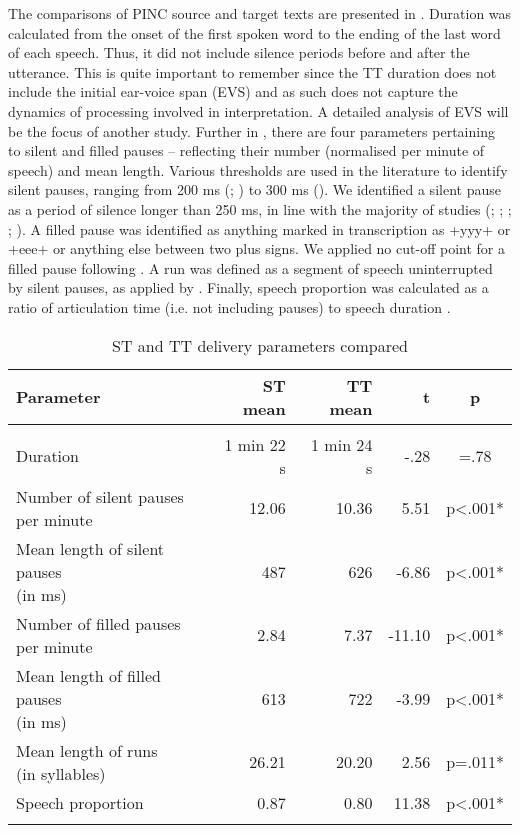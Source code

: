 \documentclass[output=paper]{langscibook}
\begin{document}
The comparisons of PINC source and target texts are presented in . Duration was calculated from the onset of the first spoken word to the ending of the last word of each speech. Thus, it did not include silence periods before and after the utterance. This is quite important to remember since the TT duration does not include the initial ear-voice span (EVS) and as such does not capture the dynamics of processing involved in interpretation. A detailed analysis of EVS will be the focus of another study. Further in , there are four parameters pertaining to silent and filled pauses – reflecting their number (normalised per minute of speech) and mean length. Various thresholds are used in the literature to identify silent pauses, ranging from 200 ms (\citealt{ChmielEtAl2017ear}; \citealt{CollardDefrancq2019}) to 300 ms (\citealt{WangLi2014}). We identified a silent pause as a period of silence longer than 250 ms, in line with the majority of studies (\citealt{Cecot2001}; \citealt{HanEtAl2020}; \citealt{Mead2005}; \citealt{PradasMacias2006}; \citealt{Tissi2000}). A filled pause was identified as anything marked in transcription as +yyy+ or +eee+ or anything else between two plus signs. We applied no cut-off point for a filled pause following \citet{PlevoetsDefrancq2016}. A run was defined as a segment of speech uninterrupted by silent pauses, as applied by \citet{HanEtAl2020}. Finally, speech proportion was calculated as a ratio of articulation time (i.e. not including pauses) to speech duration \citep{Lee1999}.

\begin{table}

\begin{tabularx}{\textwidth}{Xrrrc}

\lsptoprule

{\bfseries Parameter} & {\bfseries ST mean} & {\bfseries TT mean} & {\bfseries t} & {\bfseries p}\\
\midrule\\
 Duration & 1 min 22 s & 1 min 24 s & {}-.28 & =.78\\
 \makecell[tl]{Number of silent pauses\\per minute} & 12.06 & 10.36 & 5.51 & p<.001*\\
 \makecell[tl]{Mean length of silent pauses\\(in ms)} & 487 & 626 & {}-6.86 & p<.001*\\
 \makecell[tl]{Number of filled pauses\\per minute} & 2.84 & 7.37 & {}-11.10 & p<.001*\\
 \makecell[tl]{Mean length of filled pauses\\(in ms)} & 613 & 722 & {}-3.99 & p<.001*\\
 \makecell[tl]{Mean length of runs\\(in syllables)} & 26.21 & 20.20 & 2.56 & p=.011*\\
 Speech proportion & 0.87 & 0.80 & 11.38 & p<.001*\\
\lspbottomrule
\end{tabularx}
\caption{ST and TT delivery parameters compared}
\label{tab:chmiel:2}
\end{table}
\end{document}

